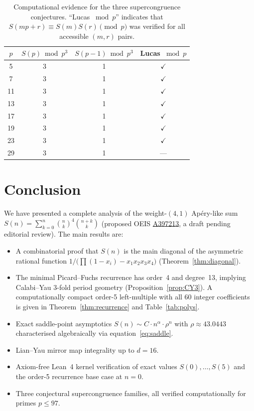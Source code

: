 \documentclass[11pt, a4paper]{article}
\begin{document}
\begin{table}[ht]
\centering
\begin{tabular}{@{}cccc@{}}
\toprule
$p$ & $S(p)\bmod p^3$ & $S(p-1)\bmod p^3$ & Lucas $\bmod p$ \\
\midrule
5  & 3 & 1 & $\checkmark$ \\
7  & 3 & 1 & $\checkmark$ \\
11 & 3 & 1 & $\checkmark$ \\
13 & 3 & 1 & $\checkmark$ \\
17 & 3 & 1 & $\checkmark$ \\
19 & 3 & 1 & $\checkmark$ \\
23 & 3 & 1 & $\checkmark$ \\
29 & 3 & 1 & --- \\
\bottomrule
\end{tabular}
\caption{%
  Computational evidence for the three supercongruence conjectures.
  ``Lucas $\bmod p$'' indicates that $S(mp+r)\equiv S(m)S(r)\pmod{p}$
  was verified for all accessible $(m,r)$ pairs.%
}
\label{tab:cong}
\end{table}


\section{Conclusion}\label{sec:conclusion}

We have presented a complete analysis of the weight-$(4,1)$ Ap\'ery-like
sum $S(n)=\sum_{k=0}^n\binom{n}{k}^4\binom{n+k}{k}$ (proposed OEIS \href{https://oeis.org/draft/A397213}{A397213}, a draft pending editorial review).  The main results are:
\begin{itemize}
  \item A combinatorial proof that $S(n)$ is the main diagonal of the
        asymmetric rational function $1/\bigl(\prod(1-x_i) - x_1 x_2 x_3 x_4\bigr)$
        (Theorem~\ref{thm:diagonal}).
  \item The minimal Picard--Fuchs recurrence has order~4 and degree~13,
        implying Calabi--Yau 3-fold period geometry
        (Proposition~\ref{prop:CY3}).  A computationally compact order-5
        left-multiple with all 60 integer coefficients is given in
        Theorem~\ref{thm:recurrence} and Table~\ref{tab:polys}.
  \item Exact saddle-point asymptotics $S(n)\sim C\cdot n^\alpha\cdot\rho^n$
        with $\rho\approx 43.0443$ characterised algebraically via
        equation~\eqref{eq:saddle}.
  \item Lian--Yau mirror map integrality up to $d=16$.
  \item Axiom-free Lean~4 kernel verification of exact values $S(0),\ldots,S(5)$
        and the order-5 recurrence base case at $n=0$.
  \item Three conjectural supercongruence families, all verified
        computationally for primes $p\le 97$.
\end{itemize}
\end{document}
